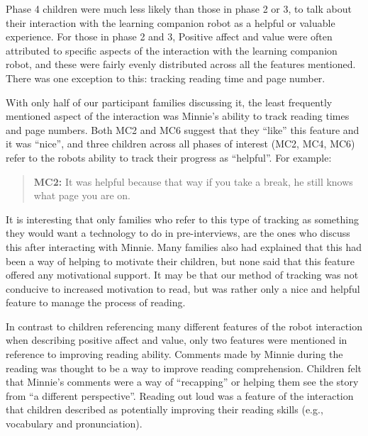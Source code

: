 \documentclass{sigchi}
\begin{document}
Phase 4 children were much less likely than those in phase 2 or 3, to talk about their interaction with the learning companion robot as a helpful or valuable experience. For those in phase 2 and 3, Positive affect and value were often attributed to specific aspects of the interaction with the learning companion robot, and these were fairly evenly distributed across all the features mentioned. There was one exception to this: tracking reading time and page number.
	
With only half of our participant families discussing it, the least frequently mentioned aspect of the interaction was Minnie's ability to track reading times and page numbers. Both MC2 and MC6 suggest that they ``like'' this feature and it was ``nice'', and three children across all phases of interest (MC2, MC4, MC6) refer to the robots ability to track their progress as ``helpful''. For example: 
	
	\begin{quote}
	\textbf{MC2:} It was helpful because that way if you take a break, he still knows what page you are on.
	\end{quote}
	
It is interesting that only families who refer to this type of tracking as something they would want a technology to do in pre-interviews, are the ones who discuss this after interacting with Minnie. Many families also had explained that this had been a way of helping to motivate their children, but none said that this feature offered any motivational support. It may be that our method of tracking was not conducive to increased motivation to read, but was rather only a nice and helpful feature to manage the process of reading.

In contrast to children referencing many different features of the robot interaction when describing positive affect and value, only two features were mentioned in reference to improving reading ability. Comments made by Minnie during the reading was thought to be a way to improve reading comprehension. Children felt that Minnie's comments were a way of ``recapping'' or helping them see the story from ``a different perspective''. Reading out loud was a feature of the interaction that children described as potentially improving their reading skills (e.g., vocabulary and pronunciation).
\end{document}
